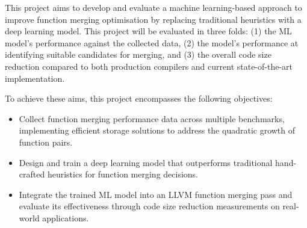 


This project aims to develop and evaluate a machine learning-based approach to improve function merging optimisation by replacing traditional heuristics with a deep learning model. This project will be evaluated in three folds: (1) the ML model's performance against the collected data, (2) the model's performance at identifying suitable candidates for merging, and (3)  the overall code size reduction compared to both production compilers and current state-of-the-art implementation.

To achieve these aims, this project encompasses the following objectives:
\begin{itemize}
    \item Collect function merging performance data across multiple benchmarks, implementing efficient storage solutions to address the quadratic growth of function pairs.
    \item Design and train a deep learning model that outperforms traditional hand-crafted heuristics for function merging decisions.
    \item Integrate the trained ML model into an LLVM function merging pass and evaluate its effectiveness through code size reduction measurements on real-world applications.
\end{itemize}


